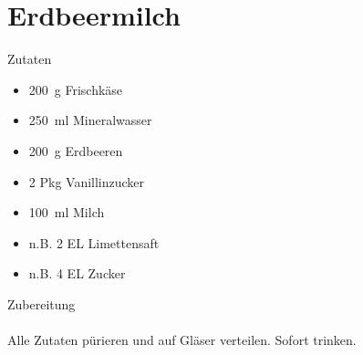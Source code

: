 \section*{Erdbeermilch}
\ihead{}\ohead{}
\cfoot{}
{\Large Zutaten}
\begin{multicols}{2}
\begin{itemize}
    \item \SI{200}{g} Frischkäse
    \item \SI{250}{ml} Mineralwasser
    \item \SI{200}{g} Erdbeeren
    \item \num{2} Pkg Vanillinzucker
    \item \SI{100}{ml} Milch
    \item n.B. \num{2} EL Limettensaft
    \item n.B. \num{4} EL Zucker
\end{itemize}
\end{multicols}
\noindent
{\Large Zubereitung}\\
\\
Alle Zutaten pürieren und auf Gläser verteilen.
Sofort trinken.
